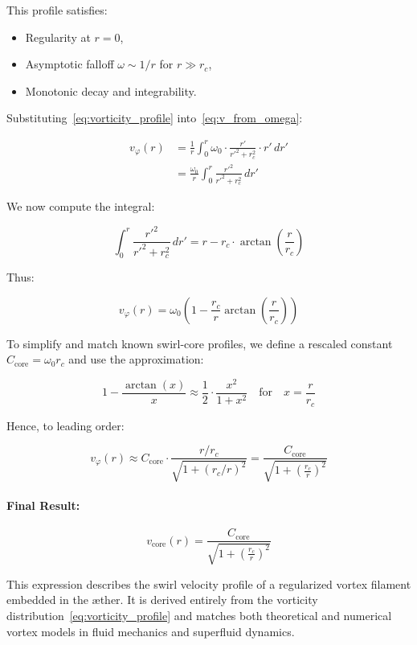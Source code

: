 \documentclass[12pt]{article}
\begin{document}
This profile satisfies:
\begin{itemize}
    \item Regularity at \( r = 0 \),
    \item Asymptotic falloff \( \omega \sim 1/r \) for \( r \gg r_c \),
    \item Monotonic decay and integrability.
\end{itemize}

Substituting~\eqref{eq:vorticity_profile} into~\eqref{eq:v_from_omega}:

\begin{align}
    v_\varphi(r)
    &= \frac{1}{r} \int_0^r \omega_0 \cdot \frac{r'}{r'^2 + r_c^2} \cdot r' \, dr' \\
    &= \frac{\omega_0}{r} \int_0^r \frac{r'^2}{r'^2 + r_c^2} \, dr'
\end{align}

We now compute the integral:

\[
\int_0^r \frac{r'^2}{r'^2 + r_c^2} \, dr'
= r - r_c \cdot \arctan\left( \frac{r}{r_c} \right)
\]

Thus:

\begin{equation}
    v_\varphi(r)
    = \omega_0 \left( 1 - \frac{r_c}{r} \arctan\left( \frac{r}{r_c} \right) \right)
    \label{eq:velocity_arctan}
\end{equation}

To simplify and match known swirl-core profiles, we define a rescaled constant \( C_{\text{core}} = \omega_0 r_c \) and use the approximation:

\[
1 - \frac{\arctan(x)}{x} \approx \frac{1}{2} \cdot \frac{x^2}{1 + x^2}
\quad \text{for} \quad x = \frac{r}{r_c}
\]

Hence, to leading order:

\[
v_\varphi(r) \approx C_{\text{core}} \cdot \frac{r/r_c}{\sqrt{1 + (r_c/r)^2}}
= \frac{C_{\text{core}}}{\sqrt{1 + \left(\frac{r_c}{r}\right)^2}}
\]

\paragraph{Final Result:}

\begin{equation}
    \boxed{
        v_\text{core}(r) = \frac{C_{\text{core}}}{\sqrt{1 + \left( \frac{r_c}{r} \right)^2 }}
    }
    \label{eq:core_velocity_final}
\end{equation}

This expression describes the swirl velocity profile of a regularized vortex filament embedded in the æther. It is derived entirely from the vorticity distribution~\eqref{eq:vorticity_profile} and matches both theoretical and numerical vortex models in fluid mechanics and superfluid dynamics.
\end{document}
